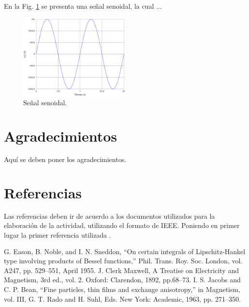 \documentclass[conference]{IEEEtran}
\begin{document}
   En la Fig. \ref{figura: senoidal} se presenta una señal senoidal, la cual ...

\begin{figure}
\centering
\includegraphics[width=0.5\textwidth]{senoidal.eps}
\caption{Señal senoidal.}
\label{figura: senoidal}
\end{figure}

\section*{Agradecimientos}

   Aquí se deben poner los agradecimientos.

\section*{Referencias}

   Las referencias deben ir de acuerdo a los documentos utilizados para la elaboración de la actividad, utilizando el formato de IEEE. Poniendo en primer lugar la primer referencia utilizada \cite{eason1955}.

\begin{thebibliography}{00}
 G. Eason, B. Noble, and I. N. Sneddon, ``On certain integrals of Lipschitz-Hankel type involving products of Bessel functions,'' Phil. Trans. Roy. Soc. London, vol. A247, pp. 529--551, April 1955.
 J. Clerk Maxwell, A Treatise on Electricity and Magnetism, 3rd ed., vol. 2. Oxford: Clarendon, 1892, pp.68--73.
 I. S. Jacobs and C. P. Bean, ``Fine particles, thin films and exchange anisotropy,'' in Magnetism, vol. III, G. T. Rado and H. Suhl, Eds. New York: Academic, 1963, pp. 271--350.
\end{thebibliography}
\end{document}
